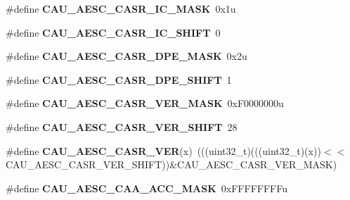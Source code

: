 \begin{DoxyCompactItemize}
\item 
\#define {\bfseries C\+A\+U\+\_\+\+A\+E\+S\+C\+\_\+\+C\+A\+S\+R\+\_\+\+I\+C\+\_\+\+M\+A\+SK}~0x1u\hypertarget{group__CAU__Register__Masks_ga1cdbe3e5dcccfef7d740aa8474df5263}{}\label{group__CAU__Register__Masks_ga1cdbe3e5dcccfef7d740aa8474df5263}

\item 
\#define {\bfseries C\+A\+U\+\_\+\+A\+E\+S\+C\+\_\+\+C\+A\+S\+R\+\_\+\+I\+C\+\_\+\+S\+H\+I\+FT}~0\hypertarget{group__CAU__Register__Masks_ga6d38ea3ba55f1a1fdb7f01d217c387ed}{}\label{group__CAU__Register__Masks_ga6d38ea3ba55f1a1fdb7f01d217c387ed}

\item 
\#define {\bfseries C\+A\+U\+\_\+\+A\+E\+S\+C\+\_\+\+C\+A\+S\+R\+\_\+\+D\+P\+E\+\_\+\+M\+A\+SK}~0x2u\hypertarget{group__CAU__Register__Masks_ga40583682054346f72ca37860de1406b6}{}\label{group__CAU__Register__Masks_ga40583682054346f72ca37860de1406b6}

\item 
\#define {\bfseries C\+A\+U\+\_\+\+A\+E\+S\+C\+\_\+\+C\+A\+S\+R\+\_\+\+D\+P\+E\+\_\+\+S\+H\+I\+FT}~1\hypertarget{group__CAU__Register__Masks_gaa13642832bf71bc8d76ef211ee7de360}{}\label{group__CAU__Register__Masks_gaa13642832bf71bc8d76ef211ee7de360}

\item 
\#define {\bfseries C\+A\+U\+\_\+\+A\+E\+S\+C\+\_\+\+C\+A\+S\+R\+\_\+\+V\+E\+R\+\_\+\+M\+A\+SK}~0x\+F0000000u\hypertarget{group__CAU__Register__Masks_ga5439d1e52f7e2cd76ac43c3a82b251ac}{}\label{group__CAU__Register__Masks_ga5439d1e52f7e2cd76ac43c3a82b251ac}

\item 
\#define {\bfseries C\+A\+U\+\_\+\+A\+E\+S\+C\+\_\+\+C\+A\+S\+R\+\_\+\+V\+E\+R\+\_\+\+S\+H\+I\+FT}~28\hypertarget{group__CAU__Register__Masks_ga14f13940abf0f6bc17f633206a387423}{}\label{group__CAU__Register__Masks_ga14f13940abf0f6bc17f633206a387423}

\item 
\#define {\bfseries C\+A\+U\+\_\+\+A\+E\+S\+C\+\_\+\+C\+A\+S\+R\+\_\+\+V\+ER}(x)~(((uint32\+\_\+t)(((uint32\+\_\+t)(x))$<$$<$C\+A\+U\+\_\+\+A\+E\+S\+C\+\_\+\+C\+A\+S\+R\+\_\+\+V\+E\+R\+\_\+\+S\+H\+I\+FT))\&C\+A\+U\+\_\+\+A\+E\+S\+C\+\_\+\+C\+A\+S\+R\+\_\+\+V\+E\+R\+\_\+\+M\+A\+SK)\hypertarget{group__CAU__Register__Masks_ga83db0296057530f6476583f9d45b9e26}{}\label{group__CAU__Register__Masks_ga83db0296057530f6476583f9d45b9e26}

\item 
\#define {\bfseries C\+A\+U\+\_\+\+A\+E\+S\+C\+\_\+\+C\+A\+A\+\_\+\+A\+C\+C\+\_\+\+M\+A\+SK}~0x\+F\+F\+F\+F\+F\+F\+F\+Fu\hypertarget{group__CAU__Register__Masks_ga3c6971358e98de3e28c7d2602473a3d3}{}\label{group__CAU__Register__Masks_ga3c6971358e98de3e28c7d2602473a3d3}


\end{DoxyCompactItemize}
